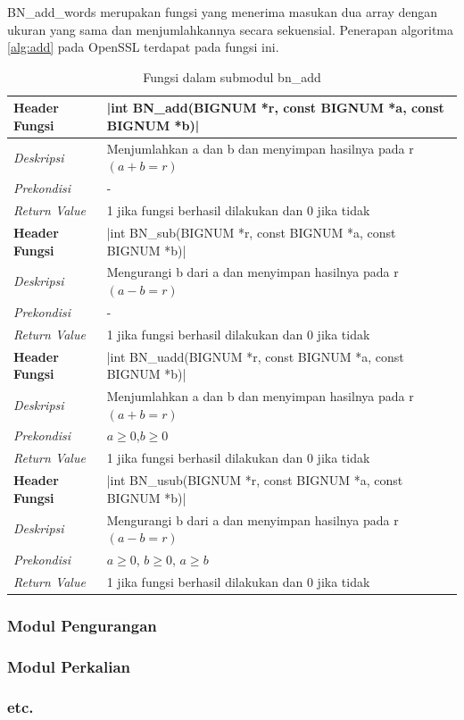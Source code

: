 BN\_add\_words merupakan fungsi yang menerima masukan dua array dengan ukuran yang sama dan menjumlahkannya secara sekuensial. Penerapan algoritma \ref{alg:add} pada OpenSSL terdapat pada fungsi ini.

\begin{table}[!h]
  \caption{Fungsi dalam submodul bn\_add}

  \begin{tabular}{R{2.5cm}L{10.5cm}}
\toprule
\textbf{Header Fungsi} & |int BN_add(BIGNUM *r, const BIGNUM *a, const BIGNUM *b)|    \\ \midrule
\textit{Deskripsi}    & Menjumlahkan a dan b dan menyimpan hasilnya pada r $(a+b=r)$ \\
\textit{Prekondisi}    & - \\
\textit{Return Value}  & 1 jika fungsi berhasil dilakukan dan 0 jika tidak
 \\ \bottomrule
\textbf{Header Fungsi} & |int BN_sub(BIGNUM *r, const BIGNUM *a, const BIGNUM *b)|    \\ \midrule
\textit{Deskripsi}    & Mengurangi b dari a dan menyimpan hasilnya pada r $(a-b=r)$ \\
\textit{Prekondisi}    & - \\
\textit{Return Value}  & 1 jika fungsi berhasil dilakukan dan 0 jika tidak
 \\ \bottomrule
\textbf{Header Fungsi} & |int BN_uadd(BIGNUM *r, const BIGNUM *a, const BIGNUM *b)|    \\ \midrule
\textit{Deskripsi}    & Menjumlahkan a dan b dan menyimpan hasilnya pada r $(a+b=r)$ \\
\textit{Prekondisi}    & $a \geq 0$,$ b \geq 0$ \\
\textit{Return Value}  & 1 jika fungsi berhasil dilakukan dan 0 jika tidak
 \\ \bottomrule
\textbf{Header Fungsi} & |int BN_usub(BIGNUM *r, const BIGNUM *a, const BIGNUM *b)|    \\ \midrule
\textit{Deskripsi}    & Mengurangi b dari a dan menyimpan hasilnya pada r $(a-b=r)$ \\
\textit{Prekondisi}    & $a \geq 0$, $b \geq 0$, $a \geq b$ \\
\textit{Return Value}  & 1 jika fungsi berhasil dilakukan dan 0 jika tidak
 \\ \bottomrule
\end{tabular}

\end{table}


\subsubsection{Modul Pengurangan}
\subsubsection{Modul Perkalian}
\subsubsection{etc.}

